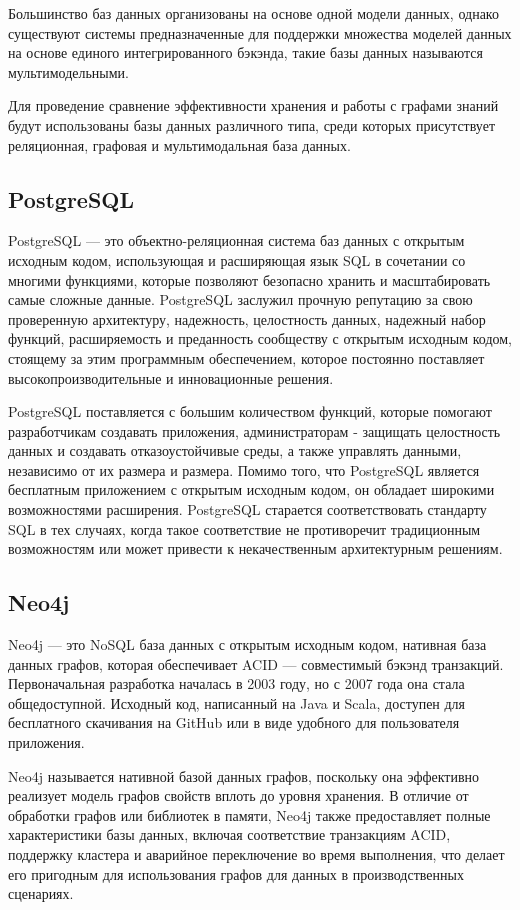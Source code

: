 Большинство баз данных организованы на основе одной модели данных, однако существуют системы предназначенные для поддержки множества
моделей данных на основе единого интегрированного бэкэнда, такие базы данных называются мультимодельными.

Для проведение сравнение эффективности хранения и работы с графами знаний будут использованы базы данных различного типа, среди которых
присутствует реляционная, графовая и мультимодальная база данных.

\subsection{PostgreSQL}

PostgreSQL — это объектно-реляционная система баз данных с открытым исходным кодом, использующая и расширяющая язык SQL в сочетании со
многими функциями, которые позволяют безопасно хранить и масштабировать самые сложные данные. PostgreSQL заслужил прочную репутацию за
свою проверенную архитектуру, надежность, целостность данных, надежный набор функций, расширяемость и преданность сообществу с открытым
исходным кодом, стоящему за этим программным обеспечением, которое постоянно поставляет высокопроизводительные и инновационные решения.

PostgreSQL поставляется с большим количеством функций, которые помогают разработчикам создавать приложения, администраторам - защищать
целостность данных и создавать отказоустойчивые среды, а также управлять данными, независимо от их размера и размера. Помимо того, что
PostgreSQL является бесплатным приложением с открытым исходным кодом, он обладает широкими возможностями расширения. PostgreSQL старается
соответствовать стандарту SQL в тех случаях, когда такое соответствие не противоречит традиционным возможностям или может привести к
некачественным архитектурным решениям.

\subsection{Neo4j}

Neo4j — это NoSQL база данных с открытым исходным кодом, нативная база данных графов, которая обеспечивает ACID — совместимый бэкэнд
транзакций. Первоначальная разработка началась в 2003 году, но с 2007 года она стала общедоступной. Исходный код, написанный на Java и Scala,
доступен для бесплатного скачивания на GitHub или в виде удобного для пользователя приложения.

Neo4j называется нативной базой данных графов, поскольку она эффективно реализует модель графов свойств вплоть до уровня хранения.
В отличие от обработки графов или библиотек в памяти, Neo4j также предоставляет полные характеристики базы данных, включая соответствие
транзакциям ACID, поддержку кластера и аварийное переключение во время выполнения, что делает его пригодным для использования графов для
данных в производственных сценариях.

